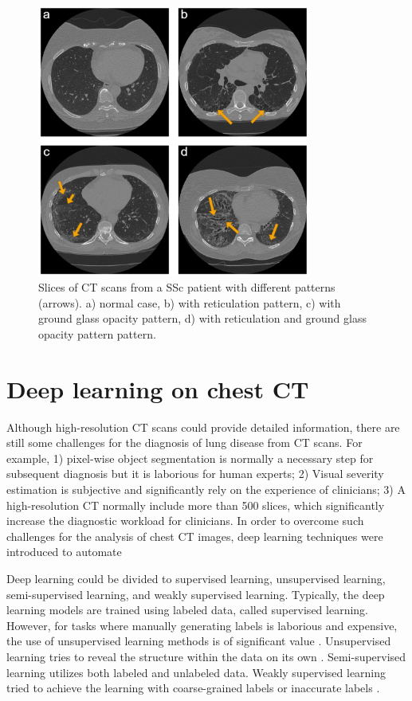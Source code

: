 \begin{figure}[tb]
    \centering
    \includegraphics[width=0.8\textwidth]{Introduction/figures/ct_samples.png}
    \caption{Slices of CT scans from a SSc patient with different patterns (arrows). a) normal case, b) with reticulation pattern, c) with ground glass opacity pattern, d) with reticulation and ground glass opacity pattern pattern.}
    \label{fig:chap1_ct_samples}
\end{figure}



\section{Deep learning on chest CT}

Although high-resolution CT scans could provide detailed information, there are still some challenges for the diagnosis of lung disease from CT scans. For example, 1) pixel-wise object segmentation is normally a necessary step for subsequent diagnosis but it is laborious for human experts; 2) Visual severity estimation is subjective and significantly rely on the experience of clinicians; 3) A high-resolution CT normally include more than 500 slices, which significantly increase the diagnostic workload for clinicians. In order to overcome such challenges for the analysis of chest CT images, deep learning techniques were introduced to automate 

Deep learning could be divided to supervised learning, unsupervised learning,  semi-supervised learning, and weakly supervised learning. Typically, the deep learning models are trained using labeled data, called supervised learning. However, for tasks where manually generating labels is laborious and expensive, the use of unsupervised learning methods is of significant value \cite{hussein2019lung}. Unsupervised learning tries to reveal the structure within the data on its own \cite{liang2020model}. Semi-supervised learning utilizes both labeled and unlabeled data. Weakly supervised learning tried to achieve the learning with coarse-grained labels or inaccurate labels \cite{zhou2018brief}.

